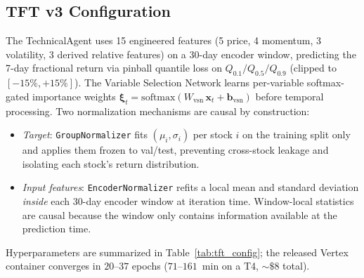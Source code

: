 \documentclass[conference]{IEEEtran}
\begin{document}
\subsection{TFT v3 Configuration}

The TechnicalAgent uses 15 engineered features (5 price, 4 momentum, 3 volatility, 3 derived relative features) on a 30-day encoder window, predicting the 7-day fractional return via pinball quantile loss on $Q_{0.1}/Q_{0.5}/Q_{0.9}$ (clipped to $[-15\%, +15\%]$). The Variable Selection Network learns per-variable softmax-gated importance weights $\boldsymbol{\xi}_t = \text{softmax}(W_\text{vsn}\,\mathbf{x}_t + \mathbf{b}_\text{vsn})$ before temporal processing. Two normalization mechanisms are causal by construction:
\begin{itemize}
\item \emph{Target}: \texttt{GroupNormalizer} fits $(\mu_i, \sigma_i)$ per stock $i$ on the training split only and applies them frozen to val/test, preventing cross-stock leakage and isolating each stock's return distribution.
\item \emph{Input features}: \texttt{EncoderNormalizer} refits a local mean and standard deviation \emph{inside} each 30-day encoder window at iteration time. Window-local statistics are causal because the window only contains information available at the prediction time.
\end{itemize}
Hyperparameters are summarized in Table~\ref{tab:tft_config}; the released Vertex container converges in $20$--$37$ epochs ($71$--$161$~min on a T4, $\sim\!\$8$ total).
\end{document}
